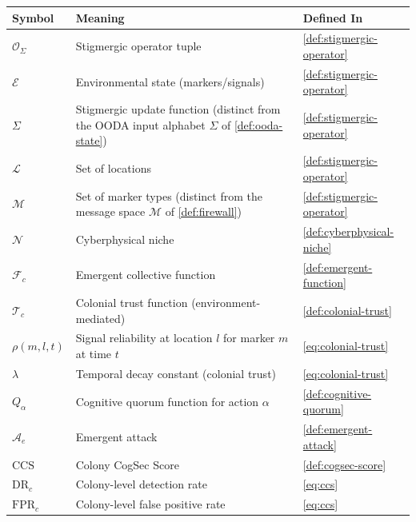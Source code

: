 \documentclass[
]{article}
\newcounter{none} %
\begin{document}
{\def\LTcaptype{none} %
\begin{longtable}[]{@{}
  >{\raggedright\arraybackslash}p{}
  >{\raggedright\arraybackslash}p{}
  >{\raggedright\arraybackslash}p{}@{}}
\toprule\noalign{}
\begin{minipage}[b]{\linewidth}\raggedright
Symbol
\end{minipage} & \begin{minipage}[b]{\linewidth}\raggedright
Meaning
\end{minipage} & \begin{minipage}[b]{\linewidth}\raggedright
Defined In
\end{minipage} \\
\midrule\noalign{}
\endhead
\bottomrule\noalign{}
\endlastfoot
\(\mathcal{O}_\Sigma\) & Stigmergic operator tuple &
\cref{def:stigmergic-operator} \\
\(\mathcal{E}\) & Environmental state (markers/signals) &
\cref{def:stigmergic-operator} \\
\(\Sigma\) & Stigmergic update function (distinct from the OODA input
alphabet \(\Sigma\) of \cref{def:ooda-state}) &
\cref{def:stigmergic-operator} \\
\(\mathcal{L}\) & Set of locations & \cref{def:stigmergic-operator} \\
\(\mathcal{M}\) & Set of marker types (distinct from the message space
\(\mathcal{M}\) of \cref{def:firewall}) &
\cref{def:stigmergic-operator} \\
\(\mathcal{N}\) & Cyberphysical niche &
\cref{def:cyberphysical-niche} \\
\(\mathcal{F}_c\) & Emergent collective function &
\cref{def:emergent-function} \\
\(\mathcal{T}_c\) & Colonial trust function (environment-mediated) &
\cref{def:colonial-trust} \\
\(\rho(m, l, t)\) & Signal reliability at location \(l\) for marker
\(m\) at time \(t\) & \cref{eq:colonial-trust} \\
\(\lambda\) & Temporal decay constant (colonial trust) &
\cref{eq:colonial-trust} \\
\(Q_\alpha\) & Cognitive quorum function for action \(\alpha\) &
\cref{def:cognitive-quorum} \\
\(\mathcal{A}_e\) & Emergent attack & \cref{def:emergent-attack} \\
\(\text{CCS}\) & Colony CogSec Score & \cref{def:cogsec-score} \\
\(\text{DR}_c\) & Colony-level detection rate & \cref{eq:ccs} \\
\(\text{FPR}_c\) & Colony-level false positive rate & \cref{eq:ccs} \\
\end{longtable}
}
\end{document}
